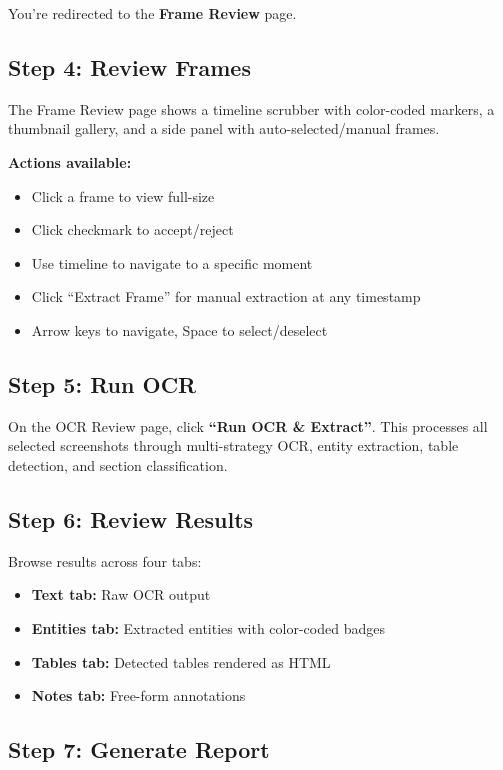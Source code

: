 \documentclass[12pt, a4paper]{article}
\begin{document}
You're redirected to the \textbf{Frame Review} page.

\subsection{Step 4: Review Frames}

The Frame Review page shows a timeline scrubber with color-coded markers, a thumbnail gallery, and a side panel with auto-selected/manual frames.

\textbf{Actions available:}
\begin{itemize}
    \item Click a frame to view full-size
    \item Click checkmark to accept/reject
    \item Use timeline to navigate to a specific moment
    \item Click ``Extract Frame'' for manual extraction at any timestamp
    \item Arrow keys to navigate, Space to select/deselect
\end{itemize}

\subsection{Step 5: Run OCR}

On the OCR Review page, click \textbf{``Run OCR \& Extract''}. This processes all selected screenshots through multi-strategy OCR, entity extraction, table detection, and section classification.

\subsection{Step 6: Review Results}

Browse results across four tabs:
\begin{itemize}
    \item \textbf{Text tab:} Raw OCR output
    \item \textbf{Entities tab:} Extracted entities with color-coded badges
    \item \textbf{Tables tab:} Detected tables rendered as HTML
    \item \textbf{Notes tab:} Free-form annotations
\end{itemize}

\subsection{Step 7: Generate Report}
\end{document}
